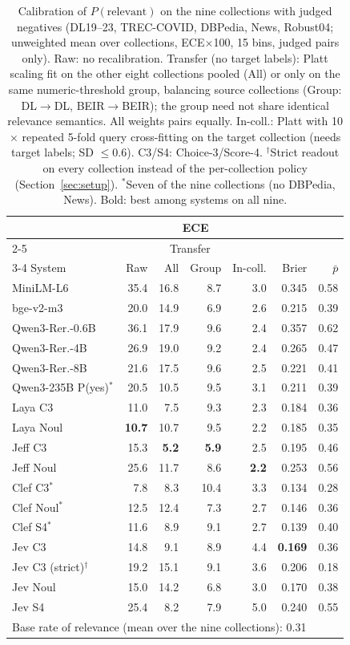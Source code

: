 \begin{table}[t]
\centering
\footnotesize
\setlength{\tabcolsep}{1.6pt}
\caption{Calibration of $P(\text{relevant})$ on the nine collections with judged negatives (DL19--23, TREC-COVID, DBPedia, News, Robust04; unweighted mean over collections, ECE$\times$100, 15 bins, judged pairs only). Raw: no recalibration. Transfer (no target labels): Platt scaling fit on the other eight collections pooled (All) or only on the same numeric-threshold group, balancing source collections (Group: DL$\to$DL, BEIR$\to$BEIR); the group need not share identical relevance semantics. All weights pairs equally. In-coll.: Platt with 10$\times$ repeated 5-fold query cross-fitting on the target collection (needs target labels; SD $\le$0.6). C3/S4: Choice-3/Score-4. $^\dagger$Strict readout on every collection instead of the per-collection policy (Section~\ref{sec:setup}). $^\ast$Seven of the nine collections (no DBPedia, News). Bold: best among systems on all nine.}
\label{tab:calibration}
\begin{tabular}{lrrrrrr}
\toprule
 & \multicolumn{4}{c}{ECE} & & \\ \cmidrule(lr){2-5}
 & & \multicolumn{2}{c}{Transfer} & & & \\ \cmidrule(lr){3-4}
System & Raw & All & Group & In-coll. & Brier & $\bar{p}$ \\
\midrule
MiniLM-L6 & 35.4 & 16.8 & 8.7 & 3.0 & 0.345 & 0.58 \\
bge-v2-m3 & 20.0 & 14.9 & 6.9 & 2.6 & 0.215 & 0.39 \\
Qwen3-Rer.-0.6B & 36.1 & 17.9 & 9.6 & 2.4 & 0.357 & 0.62 \\
Qwen3-Rer.-4B & 26.9 & 19.0 & 9.2 & 2.4 & 0.265 & 0.47 \\
Qwen3-Rer.-8B & 21.6 & 17.5 & 9.6 & 2.5 & 0.221 & 0.41 \\
Qwen3-235B P(yes)$^\ast$ & 20.5 & 10.5 & 9.5 & 3.1 & 0.211 & 0.39 \\
Laya C3 & 11.0 & 7.5 & 9.3 & 2.3 & 0.184 & 0.36 \\
Laya Noul & \textbf{10.7} & 10.7 & 9.5 & 2.2 & 0.185 & 0.35 \\
Jeff C3 & 15.3 & \textbf{5.2} & \textbf{5.9} & 2.5 & 0.195 & 0.46 \\
Jeff Noul & 25.6 & 11.7 & 8.6 & \textbf{2.2} & 0.253 & 0.56 \\
Clef C3$^\ast$ & 7.8 & 8.3 & 10.4 & 3.3 & 0.134 & 0.28 \\
Clef Noul$^\ast$ & 12.5 & 12.4 & 7.3 & 2.7 & 0.146 & 0.36 \\
Clef S4$^\ast$ & 11.6 & 8.9 & 9.1 & 2.7 & 0.139 & 0.40 \\
Jev C3 & 14.8 & 9.1 & 8.9 & 4.4 & \textbf{0.169} & 0.36 \\
Jev C3 (strict)$^\dagger$ & 19.2 & 15.1 & 9.1 & 3.6 & 0.206 & 0.18 \\
Jev Noul & 15.0 & 14.2 & 6.8 & 3.0 & 0.170 & 0.38 \\
Jev S4 & 25.4 & 8.2 & 7.9 & 5.0 & 0.240 & 0.55 \\
\midrule
\multicolumn{7}{l}{\footnotesize Base rate of relevance (mean over the nine collections): 0.31} \\
\bottomrule
\end{tabular}
\end{table}